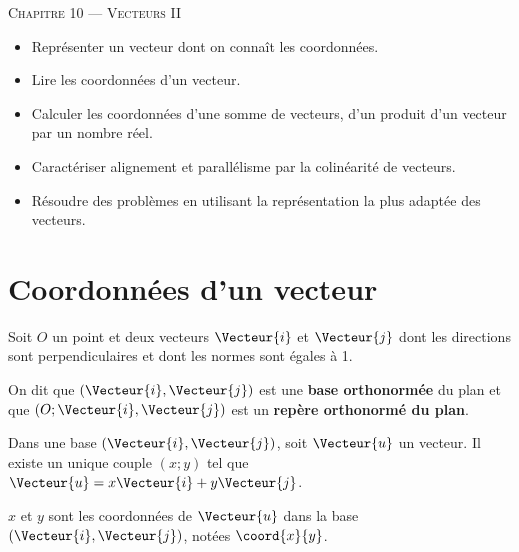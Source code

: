 \documentclass[a4paper]{article}
\begin{document}
\begin{center}
  {\scshape\LARGE Chapitre 10 --- Vecteurs II\par}
\end{center}

\begin{savoirfaire}{}{}
    \begin{itemize}[label=$\square$]
        \item Représenter un vecteur dont on conna\^it les coordonnées.
        \item Lire les coordonnées d’un vecteur.
        \item Calculer les coordonnées d’une somme de vecteurs, d’un produit d’un vecteur par un nombre réel.
        \item Caractériser alignement et parallélisme par la colinéarité de vecteurs.
        \item Résoudre des problèmes en utilisant la représentation la plus adaptée des vecteurs.
    \end{itemize}
\end{savoirfaire}


\section{Coordonnées d'un vecteur}
\begin{definition}{}{}
  Soit $O$ un point et deux vecteurs $\Vecteur{i}$ et $\Vecteur{j}$ dont les directions sont 
  perpendiculaires et dont les normes sont égales à 1.

  On dit que $(\Vecteur{i},\Vecteur{j})$ est une \textbf{base orthonormée} du plan 
  et que $(O;\Vecteur{i},\Vecteur{j})$ est un \textbf{repère orthonormé du plan}.
\end{definition}

\begin{definition}{}{}
  Dans une base $(\Vecteur{i},\Vecteur{j})$, soit $\Vecteur{u}$ un vecteur. Il existe un unique couple $(x;y)$ tel que $\Vecteur{u}=x\Vecteur{i}+y\Vecteur{j}$.


  $x$ et $y$ sont les coordonnées de $\Vecteur{u}$ dans la base $(\Vecteur{i},\Vecteur{j})$, 
  notées $\coord{x}{y}$.
\end{definition}
\end{document}
